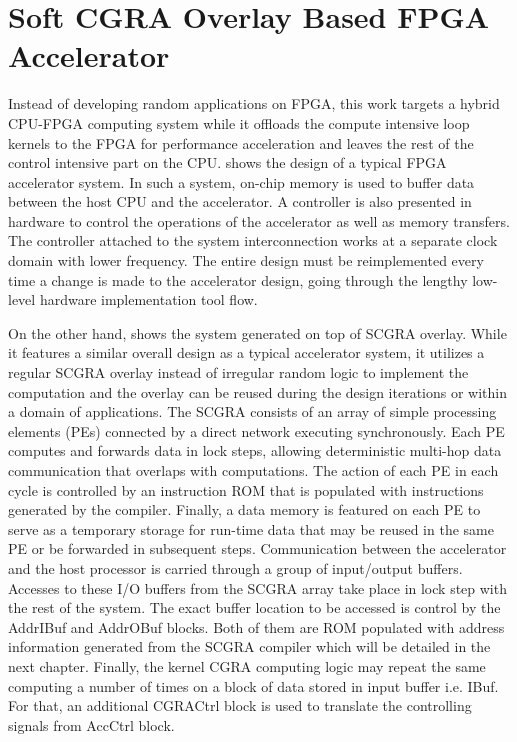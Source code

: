 \chapter{Soft CGRA Overlay Based FPGA Accelerator} \label{chapter:overlay}
Instead of developing random applications on FPGA, this work targets a hybrid CPU-FPGA computing system while it offloads the compute intensive loop kernels to the FPGA for performance acceleration and leaves the rest of the control intensive part on the CPU.  shows the design of a typical FPGA accelerator system. In such a system, on-chip memory is used to buffer data between the host CPU and the accelerator. A controller is also presented in hardware to control the operations of the accelerator as well as memory transfers. The controller attached to the system interconnection works at a separate clock domain with lower frequency. The entire design must be reimplemented every time a change is made to the accelerator design, going through the lengthy low-level hardware implementation tool flow. 

On the other hand,  shows the system generated on top of SCGRA overlay. While it features a similar overall design as a typical accelerator system, it utilizes a regular SCGRA overlay instead of irregular random logic to implement the computation and the overlay can be reused during the design iterations or within a domain of applications. The SCGRA consists of an array of simple processing elements (PEs) connected by a direct network executing synchronously. Each PE computes and forwards data in lock steps, allowing deterministic multi-hop data communication that overlaps with computations. The action of each PE in each cycle is controlled by an instruction ROM that is populated with instructions generated by the compiler. Finally, a data memory is featured on each PE to serve as a temporary storage for run-time data that may be reused in the same PE or be forwarded in subsequent steps. Communication between the accelerator and the host processor is carried through a group of input/output buffers. Accesses to these I/O buffers from the SCGRA array take place in lock step with the rest of the system. The exact buffer location to be accessed is control by the AddrIBuf and AddrOBuf blocks. Both of them are ROM populated with address information generated from the SCGRA compiler which will be detailed in the next chapter. Finally, the kernel CGRA computing logic may repeat the same computing a number of times on a block of data stored in input buffer i.e. IBuf. For that, an additional CGRACtrl block is used to translate the controlling signals from AccCtrl block.   

